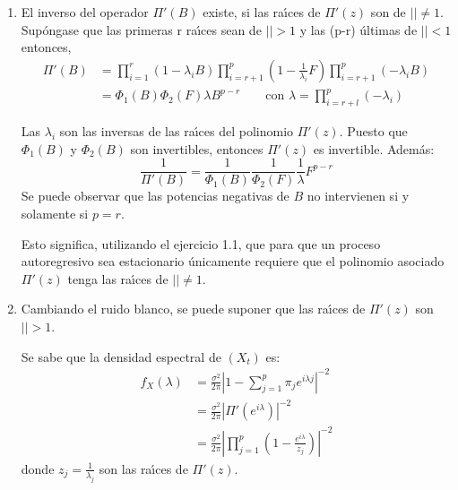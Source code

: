 \begin{observacion}
 
\begin{enumerate}
\item El inverso del operador $\Pi'(B)$ existe, si las ra\'{\i}ces de $\Pi'(z)$ son de $\left| \right|\ne 1$. Sup\'{o}ngase que las primeras r ra\'{\i}ces sean de $\left| \right|>1$ y las (p-r) \'{u}ltimas de $\left| \right|<1$
entonces, 
\begin{align*}
 \Pi'(B)
	 &=\prod_{i=1}^{r} (1-\lambda_{i} B)\prod_{i=r+1}^{p} \left( {1-\frac{1}{\lambda_{i} }F} \right)\prod_{i=r+1}^{p} (-\lambda_{i} B)\\
	 &=\Phi_{1} \left( B \right)\Phi_{2} (F)\lambda B^{p-r}\qquad\text{con }\lambda 
=\prod_{i=r+l}^{p} \left( {-\lambda_{i} } \right)
\end{align*}

Las $\lambda_{i}$ son las inversas de las ra\'{\i}ces del polinomio 
${\Pi }'\left( z \right)$. Puesto que $\Phi_{1} (B)$ y $\Phi_{2} 
(B)$ son invertibles, entonces $\Pi'(z)$ es invertible. Adem\'{a}s:
\[
\frac{1}{\Pi'(B)}=\frac{1}{\Phi_{1} (B)}\frac{1}{\Phi_{2} 
(F)}\frac{1}{\lambda }F^{p-r}
\]
Se puede observar que las potencias negativas de $B$ no intervienen si y 
solamente si $p=r$.

Esto significa, utilizando el ejercicio 1.1, que para que un proceso 
autoregresivo sea estacionario \'{u}nicamente requiere que el polinomio 
asociado ${\Pi }'\left( z \right)$ tenga las ra\'{\i}ces de 
$\left| \right|\ne 1$.

\item Cambiando el ruido blanco, se puede suponer que las ra\'{\i}ces de $\Pi'(z)$ son $\left| \right|>1$.

Se sabe que la densidad espectral de $(X_{{t}})$ es:
\begin{align*}
 f_{X} (\lambda )
	 &=\frac{\sigma^{2}}{2\pi }\left| {1-\sum_{j=1}^p {\pi_{j} e^{i\lambda j}} } \right|^{-2}\\
	 &=\frac{\sigma ^{2}}{2\pi }\left| {\Pi'(e^{i\lambda })} \right|^{-2}\\
	 &=\frac{\sigma^{2}}{2\pi }\left| {\prod_{j=1}^{p} \left({1-\frac{e^{i\lambda }}{z_{j} }} \right)} \right|^{-2}
\end{align*}
donde $z_{j} =\frac{1}{\lambda_{j} }$ son las ra\'{\i}ces de $\Pi'(z)$.


\end{enumerate}
\end{observacion}
